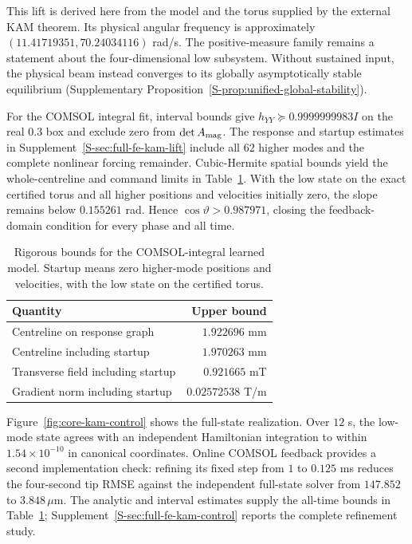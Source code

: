 This lift is derived here from the model and the torus supplied by the external KAM theorem. Its physical angular frequency is approximately $(11.41719351,70.24034116)$ rad/s. The positive-measure family remains a statement about the four-dimensional low subsystem. Without sustained input, the physical beam instead converges to its globally asymptotically stable equilibrium (Supplementary Proposition~\ref{S-prop:unified-global-stability}).

For the COMSOL integral fit, interval bounds give $h_{YY}\succeq0.9999999983I$ on the real $0.3$ box and exclude zero from $\det A_{\rm mag}$. The response and startup estimates in Supplement~\ref{S-sec:full-fe-kam-lift} include all $62$ higher modes and the complete nonlinear forcing remainder. Cubic-Hermite spatial bounds yield the whole-centreline and command limits in Table~\ref{tab:core-operation}. With the low state on the exact certified torus and all higher positions and velocities initially zero, the slope remains below $0.155261$ rad. Hence $\cos\vartheta>0.987971$, closing the feedback-domain condition for every phase and all time.

\begin{table}[t]
\centering
\caption{Rigorous bounds for the COMSOL-integral learned model. Startup means zero higher-mode positions and velocities, with the low state on the certified torus.}
\label{tab:core-operation}
\begin{tabular}{lr}
\toprule
Quantity & Upper bound\\
\midrule
Centreline on response graph & $1.922696$ mm\\
Centreline including startup & $1.970263$ mm\\
Transverse field including startup & $0.921665$ mT\\
Gradient norm including startup & $0.02572538$ T/m\\
\bottomrule
\end{tabular}
\end{table}

Figure~\ref{fig:core-kam-control} shows the full-state realization. Over $12$ s, the low-mode state agrees with an independent Hamiltonian integration to within $1.54\times10^{-10}$ in canonical coordinates. Online COMSOL feedback provides a second implementation check: refining its fixed step from $1$ to $0.125$ ms reduces the four-second tip RMSE against the independent full-state solver from $147.852$ to $3.848\,\mu$m. The analytic and interval estimates supply the all-time bounds in Table~\ref{tab:core-operation}; Supplement~\ref{S-sec:full-fe-kam-control} reports the complete refinement study.

